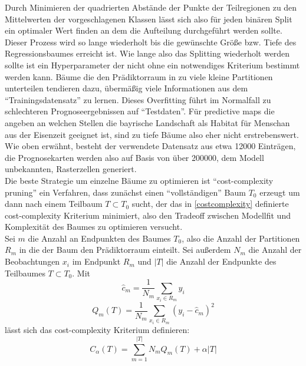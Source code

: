 Durch Minimieren der quadrierten Abstände der Punkte der Teilregionen zu den Mittelwerten der vorgeschlagenen Klassen lässt sich also für jeden binären Split ein optimaler Wert finden an dem die Aufteilung durchgeführt werden sollte. 
Dieser Prozess wird so lange wiederholt bis die gewünschte Größe bzw. Tiefe des Regressionsbaumes erreicht ist. Wie lange also das Splitting wiederholt werden sollte ist ein Hyperparameter der nicht ohne ein notwendiges Kriterium bestimmt werden kann. Bäume die den Prädiktorraum in zu viele kleine Partitionen unterteilen tendieren dazu, übermäßig viele Informationen aus dem ``Trainingsdatensatz'' zu lernen. Dieses Overfitting führt im Normalfall zu schlechteren Prognoseergebnissen auf ``Testdaten''. Für predictive maps die angeben an welchen Stellen die bayrische Landschaft als Habitat für Menschan aus der Eisenzeit geeignet ist, sind zu tiefe Bäume also eher nicht erstrebenswert. Wie oben erwähnt, besteht der verwendete Datensatz aus etwa 12000 Einträgen, die Prognosekarten werden also auf Basis von über 200000, dem Modell unbekannten, Rasterzellen generiert.\\ Die beste Strategie um einzelne Bäume zu optimieren ist ``cost-complexity pruning'' ein Verfahren, dass zunächst einen ``vollständigen'' Baum $T_{0}$ erzeugt um dann nach einem Teilbaum $T \subset T_{0}$ sucht, der das in \ref{costcomplexity} definierte cost-complexity Kriterium minimiert, also den Tradeoff zwischen Modellfit und Komplexität des Baumes zu optimieren versucht. \\
Sei $m$ die Anzahl an Endpunkten des Baumes $T_{0}$, also die Anzahl der Partitionen $R_{m}$ in die der Baum den Prädiktorraum einteilt. Sei außerdem $N_{m}$ die Anzahl der Beobachtungen $x_{i}$ im Endpunkt $R_{m}$ und $|T|$ die Anzahl der Endpunkte des Teilbaumes  $T \subset T_{0}$.
Mit \\
\begin{equation}
    \label{treecost1}
    \hat{c}_{m}=\frac{1}{N_{m}} \sum_{x_{i} \in R_{m}} y_{i}
\end{equation}
\begin{equation}
    \label{treecost2}
    Q_{m}(T)=\frac{1}{N_{m}} \sum_{x_{i} \in R_{m}}\left(y_{i}-\hat{c}_{m}\right)^{2}
\end{equation}
lässt sich das cost-complexity Kriterium definieren: 
\begin{equation}
    \label{costcomplexity}
    C_{\alpha}(T)=\sum_{m=1}^{|T|} N_{m} Q_{m}(T)+\alpha|T|
\end{equation}

